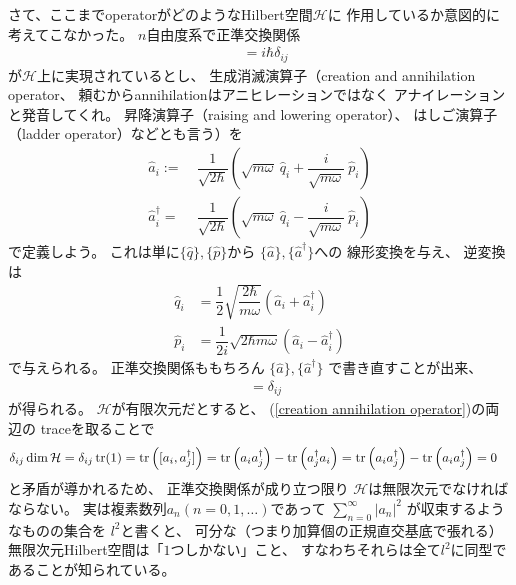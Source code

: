 さて、ここまでoperatorがどのようなHilbert空間$\mathcal{H}$に
作用しているか意図的に考えてこなかった。
$n$自由度系で正準交換関係
\begin{align}
    [ \hat{q}_i , \hat{p}_j ] &= i\hbar \delta_{ij}
\end{align}
が$\mathcal{H}$上に実現されているとし、
生成消滅演算子（creation and annihilation operator、
頼むからannihilationはアニヒレーションではなく
アナイレーションと発音してくれ。
昇降演算子（raising and lowering operator）、
はしご演算子（ladder operator）などとも言う）を
\begin{align}
    \hat{a}_i :=\ &
    \dfrac{1}{\sqrt{2\hbar}}
    \left(
        \sqrt{
            m\omega
        }\ \hat{q}_i
        +
        \dfrac{i}{\sqrt{m\omega}}
        \ \hat{p}_i
    \right)
\\
    \hat{a}^\dagger_i =\ &
    \dfrac{1}{\sqrt{2\hbar}}
    \left(
        \sqrt{
            m\omega
        }\ \hat{q}_i
        -
        \dfrac{i}{\sqrt{m\omega}}
        \ \hat{p}_i
    \right)
\end{align}
で定義しよう。
これは単に$\{\hat{q}\}, \{\hat{p}\}$から
$\{\hat{a}\}, \{\hat{a}^\dagger\}$への
線形変換を与え、
逆変換は
\begin{subequations}
\begin{align}
    \hat{q}_i &=
    \dfrac{1}{2}\sqrt{
        \dfrac{2\hbar}{m\omega}
    }
    \left(
        \hat{a}_i + \hat{a}^\dagger_i
    \right)
\\
    \hat{p}_i &=
    \dfrac{1}{2i}\sqrt{
        2\hbar m\omega
    }
    \left(
        \hat{a}_i - \hat{a}^\dagger_i
    \right)
\end{align}
\end{subequations}
で与えられる。
正準交換関係ももちろん
$\{\hat{a}\}, \{\hat{a}^\dagger\}$
で書き直すことが出来、
\begin{align}
    [\hat{a}_i, \hat{a}^\dagger_j]
    &=\delta_{ij}
\label{creation annihilation operator}
\end{align}
が得られる。
$ \mathcal{H} $が有限次元だとすると、
(\ref{creation annihilation operator})の両辺の
traceを取ることで
\begin{align}
    \delta_{ij}
    \dim \mathcal{H}
    &=
    \delta_{ij}
    \tr (1)
    =
    \tr \left(
        [a_i, a^\dagger_j]
    \right)
    =
    \tr \left(
        a_i a^\dagger_j
    \right)
    -
    \tr \left(
        a^\dagger_j a_i
    \right)
    =
    \tr \left(
        a_i a^\dagger_j
    \right)
    -
    \tr \left(
        a_i a^\dagger_j
    \right)
    = 0
\end{align}
と矛盾が導かれるため、
正準交換関係が成り立つ限り
$\mathcal{H}$は無限次元でなければならない。
実は複素数列$a_n (n=0,1,\dots)$であって
$\sum_{n=0}^\infty |a_n|^2$
が収束するようなものの集合を
$l^2$と書くと、
可分な（つまり加算個の正規直交基底で張れる）
無限次元Hilbert空間は「$1$つしかない」こと、
すなわちそれらは全て$l^2$に同型であることが知られている。

